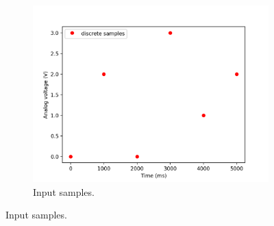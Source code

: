 \documentclass[12pt]{article}
\begin{document}
\begin{figure}
\centering
\begin{subfigure}[b]{.45\linewidth}
\includegraphics[width=\linewidth]{input-samples.png}
\caption{Input samples.}
\end{subfigure}


\end{figure}
\end{document}

